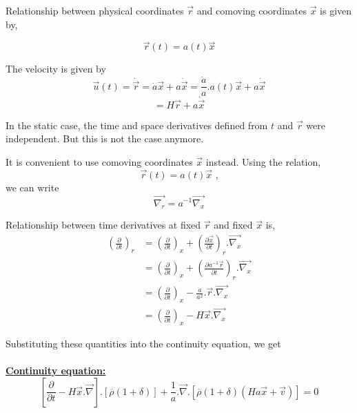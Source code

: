 \documentclass[a4,12pt,oneside]{report}
\begin{document}
	Relationship between physical coordinates $\vec{r}$ and comoving coordinates $ \vec{x} $	is given by,
	
	\begin{equation}\label{key}
	\vec{r}(t) = a(t)\vec{x}
	\end{equation}
	
	The velocity is given by
	\begin{equation}\label{key}
	\vec{u}(t) = \dot{\vec{r}} = \dot{a}\vec{x} + a\dot{\vec{x}} = \frac{\dot{a}}{a}.a(t)\vec{x} + a\dot{\vec{x}}
	\end{equation}
	\begin{equation}\label{key}
	=H\vec{r} + a\dot{\vec{x}}
	\end{equation}
	
	In the static case, the time and space derivatives defined from $ t $ and $ \vec{r} $ were independent. But this is not the case anymore.
	
	It is convenient to use comoving coordinates $ \vec{x} $ instead.
	Using the relation, 
	\begin{equation}\label{key}
	\vec{r}(t)=a(t)\vec{x} \text{  ,}
	\end{equation}
	we can write 
	\begin{equation}\label{key}
	\overrightarrow{\nabla_r} = a^{-1}\overrightarrow{\nabla_x}
	\end{equation}
	
	Relationship between time derivatives at fixed $ \vec{r} $ and fixed $ \vec{x} $ is,
	\begin{align}\label{key}
	\left(\frac{\partial}{\partial t}\right)_r &= \left(\frac{\partial}{\partial t}\right)_x + \left(\frac{\partial \vec{x}}{\partial t}\right)_r.\overrightarrow{\nabla_x} \nonumber
	\\[12pt]
	&=\left(\frac{\partial}{\partial t}\right)_x+\left(\frac{\partial a^{-1}\vec{r}}{\partial t}\right)_r.\overrightarrow{\nabla_x} \nonumber
	\\
	&=\left(\frac{\partial}{\partial t}\right)_x - \frac{\dot{a}}{a^2}.\vec{r}.\overrightarrow{\nabla_x} \nonumber
	\\
	&=\left(\frac{\partial}{\partial t}\right)_x - H\vec{x}.\overrightarrow{\nabla_x}
	\end{align}
	
	Substituting these quantities into the continuity equation, we get \\ \\
	{\bf \underline{Continuity equation:}}
	\begin{equation}\label{key}
	\left[\frac{\partial}{\partial t} - H\vec{x}.\overrightarrow{\nabla}\right].[\overline{\rho}(1+\delta)] + \frac{1}{a}.\overrightarrow{\nabla}.[\overline{\rho}(1+\delta)(Ha\vec{x}+\vec{v})] = 0
	\end{equation}
	
\end{document}
